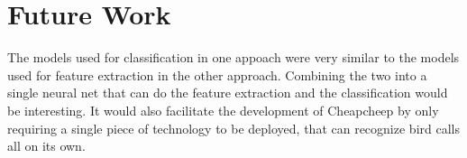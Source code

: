 \documentclass[sigconf]{acmart}
\begin{document}
\section{Future Work}

The models used for classification in one appoach were very similar to the models used for feature extraction
in the other approach. Combining the two into a single neural net that can do the feature
extraction and the classification would be interesting. It would also facilitate the development of 
Cheapcheep by only requiring a single piece of technology to be deployed, that can recognize bird calls
all on its own.










\appendix
\end{document}

